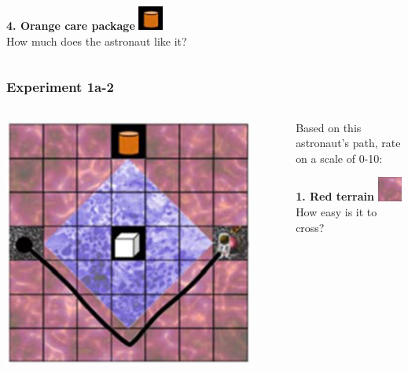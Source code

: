 \documentclass{beamer}
\begin{document}
\begin{frame}
\begin{columns}
\begin{column}{0.5\textwidth}
    \textbf{4. Orange care package} \includegraphics[width=0.8cm]{orange_carepackage.png}\\
    How much does the astronaut like it?
    \end{column}
    \end{columns}
    \end{frame}

\begin{frame}
\frametitle{Experiment 1a-2}
\begin{columns}
\begin{column}{0.5\textwidth}
\begin{center}
\includegraphics[width=0.9\textwidth]{experiment_1a-2.png}
\end{center}
\end{column}
\begin{column}{0.5\textwidth}
Based on this astronaut's path, rate on a scale of 0-10:

\vspace{0.2cm}
\textbf{1. Red terrain} \includegraphics[width=0.8cm]{red_terrain.png}\\
How easy is it to cross?
\vspace{0.2cm}


\end{column}
\end{columns}
\end{frame}
\end{document}
